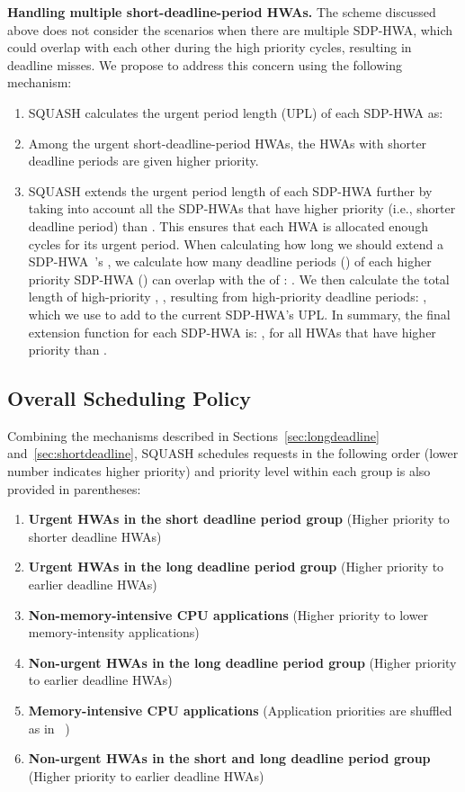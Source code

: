 \documentclass[10pt,letterpaper]{article}
\newcommand{\sdphwa}[0]{SDP-HWA\xspace}
\begin{document}
\noindent\textbf{Handling multiple short-deadline-period HWAs.}
The scheme discussed above does not consider the scenarios when there are
multiple \sdphwa, which could overlap with each other during the high priority
cycles, resulting in deadline misses.
We propose to address this concern using the following
mechanism:

\begin{enumerate}

\item
SQUASH calculates the urgent period length (UPL) of each SDP-HWA  as: \\


\item
Among the urgent short-deadline-period HWAs, the HWAs with shorter
deadline periods are given higher priority.

\item SQUASH extends the urgent period length of each SDP-HWA  further by
taking into account all the SDP-HWAs that have higher priority (i.e., shorter
deadline period) than . This ensures that each HWA is allocated enough
cycles for its urgent period. When calculating how long we should extend a
\mbox{SDP-HWA 's} , we calculate how many deadline periods ()
of each higher priority \mbox{SDP-HWA} () can overlap with the 
of : . We then calculate the
total length of high-priority , ,
resulting from  high-priority deadline periods:
, which we use to add to
the current SDP-HWA's UPL. In summary, the final extension function for each
SDP-HWA  is: , for all HWAs  that have higher priority than .



\end{enumerate}

\subsection{Overall Scheduling Policy}
\label{sec:overall-scheduling} Combining the mechanisms described in
Sections~\ref{sec:longdeadline} and~\ref{sec:shortdeadline}, SQUASH schedules
requests in the following order (lower number indicates higher priority) and
priority level within each group is also provided in parentheses:

\begin{enumerate}
\item
\textbf{Urgent HWAs in the short deadline period group} (Higher
priority to shorter deadline HWAs)
\item
\textbf{Urgent HWAs in the long deadline period group} (Higher
priority to earlier deadline HWAs)
\item
\textbf{Non-memory-intensive CPU applications} (Higher priority to
lower memory-intensity applications)
\item
\textbf{Non-urgent HWAs in the long deadline period group} (Higher
priority to earlier deadline HWAs)
\item
\textbf{Memory-intensive CPU applications} (Application priorities are
shuffled as in ~\cite{tcm})
\item
\textbf{Non-urgent HWAs in the short and long deadline period group}
(Higher priority to earlier deadline HWAs)
\end{enumerate}
\end{document}
